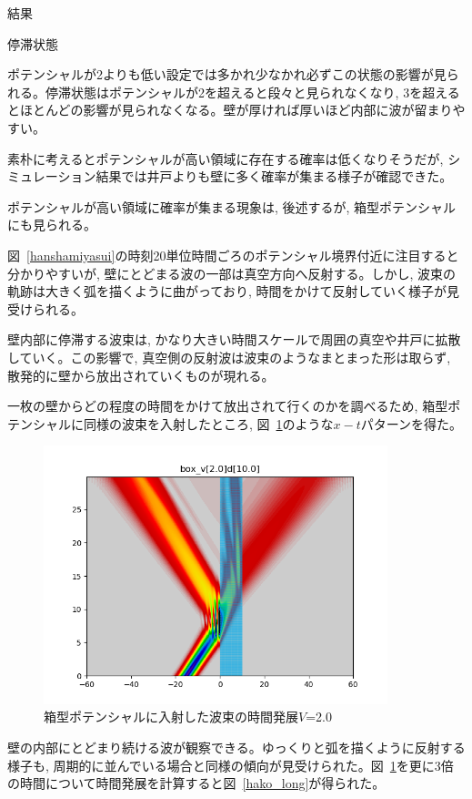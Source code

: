 \documentclass[a4paper, lualatex]{bxjsarticle}
\newcommand{\fref}[1]{図~\ref{#1}}
\begin{document}
\begin{section}{結果}
\begin{subsection}{停滞状態\label{teitais}}
        \par ポテンシャルが2よりも低い設定では多かれ少なかれ必ずこの状態の影響が見られる。停滞状態はポテンシャルが2を超えると段々と見られなくなり, 3を超えるとほとんどの影響が見られなくなる。壁が厚ければ厚いほど内部に波が留まりやすい。
        \par 素朴に考えるとポテンシャルが高い領域に存在する確率は低くなりそうだが, シミュレーション結果では井戸よりも壁に多く確率が集まる様子が確認できた。
        \par ポテンシャルが高い領域に確率が集まる現象は, 後述するが, 箱型ポテンシャルにも見られる。
        \par \fref{hanshamiyasui}の時刻20単位時間ごろのポテンシャル境界付近に注目すると分かりやすいが, 壁にとどまる波の一部は真空方向へ反射する。しかし, 波束の軌跡は大きく弧を描くように曲がっており, 時間をかけて反射していく様子が見受けられる。
        \par 壁内部に停滞する波束は, かなり大きい時間スケールで周囲の真空や井戸に拡散していく。この影響で, 真空側の反射波は波束のようなまとまった形は取らず, 散発的に壁から放出されていくものが現れる。
        \par 一枚の壁からどの程度の時間をかけて放出されて行くのかを調べるため, 箱型ポテンシャルに同様の波束を入射したところ, \fref{hako_short}のような$x-t$パターンを得た。
        \begin{figure}[h]
            \centering
            \includegraphics[width=10cm]{hako_short.png}
            \caption{箱型ポテンシャルに入射した波束の時間発展$V$=2.0}
            \label{hako_short}
        \end{figure}
        \par 壁の内部にとどまり続ける波が観察できる。ゆっくりと弧を描くように反射する様子も, 周期的に並んでいる場合と同様の傾向が見受けられた。\fref{hako_short}を更に3倍の時間について時間発展を計算すると\fref{hako_long}が得られた。

\end{subsection}
\end{section}
\end{document}
